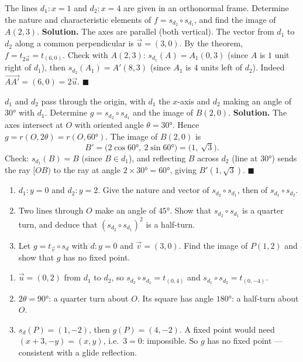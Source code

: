 \documentclass[11pt]{article}
\begin{document}
\begin{exoresolu}
The lines $d_1: x = 1$ and $d_2: x = 4$ are given in an orthonormal frame. Determine the nature and characteristic elements of $f = s_{d_2} \circ s_{d_1}$, and find the image of $A(2, 3)$.
\tcblower
\textbf{Solution.} The axes are parallel (both vertical). The vector from $d_1$ to $d_2$ along a common perpendicular is $\vec{u} = (3, 0)$. By the theorem, $f = t_{2\vec{u}} = t_{(6,0)}$.
Check with $A(2,3)$: $s_{d_1}(A) = A_1(0, 3)$ (since $A$ is $1$ unit right of $d_1$), then $s_{d_2}(A_1) = A'(8, 3)$ (since $A_1$ is $4$ units left of $d_2$). Indeed $\overrightarrow{AA'} = (6, 0) = 2\vec{u}$. $\blacksquare$
\end{exoresolu}

\begin{exoresolu}
$d_1$ and $d_2$ pass through the origin, with $d_1$ the $x$-axis and $d_2$ making an angle of $30°$ with $d_1$. Determine $g = s_{d_2} \circ s_{d_1}$ and the image of $B(2, 0)$.
\tcblower
\textbf{Solution.} The axes intersect at $O$ with oriented angle $\theta = 30°$. Hence $g = r(O, 2\theta) = r(O, 60°)$. The image of $B(2,0)$ is
\[ B' = \bigl(2\cos 60°,\ 2\sin 60°\bigr) = \bigl(1,\ \sqrt{3}\bigr). \]
Check: $s_{d_1}(B) = B$ (since $B \in d_1$), and reflecting $B$ across $d_2$ (line at $30°$) sends the ray $[OB)$ to the ray at angle $2 \times 30° = 60°$, giving $B'(1, \sqrt{3})$. $\blacksquare$
\end{exoresolu}

\begin{exercice}[Practice]
\begin{enumerate}
\item $d_1: y = 0$ and $d_2: y = 2$. Give the nature and vector of $s_{d_2} \circ s_{d_1}$, then of $s_{d_1} \circ s_{d_2}$.
\item Two lines through $O$ make an angle of $45°$. Show that $s_{d_2} \circ s_{d_1}$ is a quarter turn, and deduce that $(s_{d_2} \circ s_{d_1})^2$ is a half-turn.
\item Let $g = t_{\vec{v}} \circ s_d$ with $d: y = 0$ and $\vec{v} = (3, 0)$. Find the image of $P(1, 2)$ and show that $g$ has no fixed point.
\end{enumerate}
\end{exercice}

\begin{corrige}[Exercise 1]
\begin{enumerate}
\item $\vec{u} = (0,2)$ from $d_1$ to $d_2$, so $s_{d_2} \circ s_{d_1} = t_{(0,4)}$ and $s_{d_1} \circ s_{d_2} = t_{(0,-4)}$.
\item $2\theta = 90°$: a quarter turn about $O$. Its square has angle $180°$: a half-turn about $O$.
\item $s_d(P) = (1, -2)$, then $g(P) = (4, -2)$. A fixed point would need $(x+3, -y) = (x, y)$, i.e.\ $3 = 0$: impossible. So $g$ has no fixed point — consistent with a glide reflection.
\end{enumerate}
\end{corrige}
\end{document}
